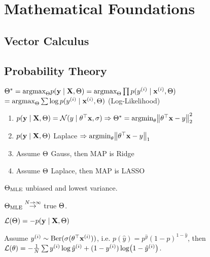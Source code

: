 \section{Mathematical Foundations}

\subsection{Vector Calculus}

\subsection{Probability Theory}

\begin{definition}[MLE]
    \(\Theta^{*} = \text{argmax}_{\Theta} p(\vb{y} \mid \vb{X}, \Theta) = \text{argmax}_{\Theta} \prod p(y^{(i)} \mid \vb{x}^{(i)}, \Theta)\)\(= \text{argmax}_{\Theta} \sum \log p(y^{(i)} \mid \vb{x}^{(i)}, \Theta)\) (Log-Likelihood)
\end{definition}

\begin{colored}
    \begin{enumerate}
        \item \(p(\vb{y} \mid \vb{X}, \Theta) = \operatorname{\mathcal{N}}(y \mid \theta^\top \vb{x}, \sigma) \Rightarrow \Theta^* = \text{argmin}_{\theta} \norm{\theta^\top \vb{x} - y}_2^2\)
        \item \(p(\vb{y} \mid \vb{X}, \Theta)\) Laplace \(\Rightarrow \text{argmin}_{\theta} \norm{\theta^\top \vb{x} - y}_1\)
        \item Assume \(\Theta\) Gauss, then MAP is Ridge
        \item Assume \(\Theta\) Laplace, then MAP is LASSO
    \end{enumerate}

    \begin{itemize*}
        \item \(\Theta_{\operatorname{MLE}}\) unbiased and lowest variance. 
        \item \(\Theta_{\operatorname{MLE}} \overset{N \to \infty}{\to}\) true \(\Theta\).
    \end{itemize*}
\end{colored}


\begin{definition}[NLL]
    \(\mathcal{L}(\Theta) = - p(\vb{y} \mid \vb{X}, \Theta)\)
\end{definition}

\begin{definition}[BCE]
    Assume \(y^{(i)} \sim \operatorname{Ber}(\sigma(\theta^\top \vb{x}^{(i)}))\), i.e. \(p(\hat y) = p^{\hat y}(1 - p)^{1 - \hat y}\), then \(\mathcal{L}(\theta) = - \frac 1 N \sum y^{(i)} \log \hat y^{(i)} + ( 1 - y^{(i)}) \log(1 - \hat y^{(i)})\).
\end{definition}

